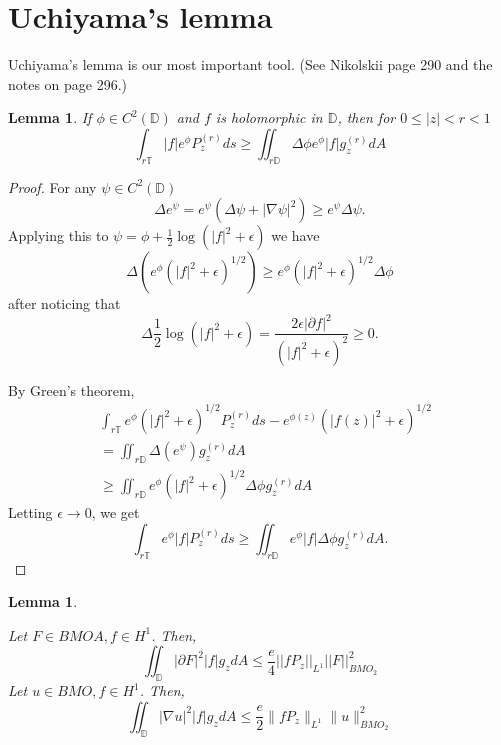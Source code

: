 \documentclass[12pt]{amsart}
\newtheorem{lemma}[theorem]{Lemma}
\theoremstyle{definition}
\theoremstyle{remark}
\numberwithin{equation}{section}
\newcommand{\D}{\mathbb{D}}
\newcommand{\T}{\mathbb{T}}
\begin{document}
\section{Uchiyama's lemma}
Uchiyama's lemma is our most important tool. (See Nikolskii \cite{nN86}
page 290 and the notes on page 296.)

\begin{lemma} \label{uchiyama} 
If $\phi \in C^2(\D)$ and $f$ is holomorphic in $\D$, then for $0\leq
|z|<r<1$
\[
\int_{r\T} |f| e^{\phi} P^{(r)}_z ds \geq \iint_{r\D} \Delta \phi e^\phi |f| g^{(r)}_z  dA
\]
\end{lemma}

\begin{proof}
For any $\psi \in C^2(\D)$
\[
\Delta e^\psi = e^\psi (\Delta \psi + |\nabla \psi|^2) \geq e^\psi
\Delta \psi.
\]
Applying this to $\psi = \phi + \frac{1}{2}\log(|f|^2+\epsilon)$
we have
\[
\Delta (e^\phi (|f|^2+\epsilon)^{1/2}) \geq e^\phi
(|f|^2+\epsilon)^{1/2} \Delta \phi
\]
after noticing that
\[
\Delta \frac{1}{2}\log (|f|^2+\epsilon) = \frac{2\epsilon |\partial
  f|^2}{(|f|^2+\epsilon)^2} \geq 0.
\]

By Green's theorem,
\[
\begin{aligned}
& \int_{r\T} e^\phi (|f|^2+\epsilon)^{1/2} P^{(r)}_z ds -
e^{\phi(z)}(|f(z)|^2+\epsilon)^{1/2} \\
&= \iint_{r\D} \Delta(e^{\psi}) g^{(r)}_z dA \\
& \geq \iint_{r\D} e^\phi (|f|^2+\epsilon)^{1/2} \Delta \phi g^{(r)}_z dA 
\end{aligned}
\]
Letting $\epsilon \to 0$, we get
\[
\int_{r\T} e^{\phi} |f| P^{(r)}_z ds \geq \iint_{r\D} e^{\phi} |f| \Delta \phi g^{(r)}_z dA.
\]
\end{proof}

\begin{lemma} \label{lem:mainlemma}

Let $F \in BMOA, f \in H^1$. Then,
\[
 \iint_{\D} |\partial F|^2 |f|
g_z dA \leq \frac{e}{4} ||f P_z||_{L^1} ||F||^2_{BMO_2}
\]
Let $u \in BMO, f \in H^1$.  Then,
\[
\iint_{\D} |\nabla u|^2 |f| g_z dA \leq \frac{e}{2} \|f P_z \|_{L^1} \|u\|^2_{BMO_2}
\]
\end{lemma}
\end{document}
